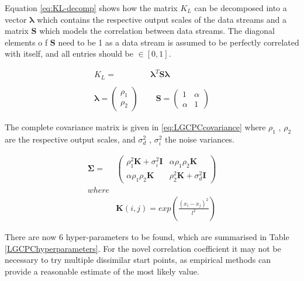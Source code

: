 \documentclass[a4paper,11pt]{report}
\begin{document}
Equation \ref{eq:KL-decomp} shows how the matrix \(K_L\) can be decomposed into a vector \(\boldsymbol{\lambda}\) which contains the respective output scales of the data streams and a matrix \(\mathbf{S}\) which models the correlation between data streams. The diagonal elements o f \(\mathbf{S}\) need to be 1 as a data stream is assumed to be perfectly correlated with itself, and all entries should be \(\in [0,1]\).

\singlespacing
\begin{equation} \label{eq:KL-decomp}
\begin{aligned}
K_L =& \boldsymbol{\lambda}^T \mathbf{S} \boldsymbol{\lambda} \\ \\
\boldsymbol{\lambda} = \left( \begin{array}{cc}
\rho_1  \\
\rho_2 \end{array} \right)\text{ } & \text{ }
\mathbf{S} = \left( \begin{array}{cc}
1 & \alpha  \\
\alpha  & 1 \end{array} \right)
\end{aligned}
\end{equation}
\doublespacing

The complete covariance matrix is given in \ref{eq:LGCPCcovariance} where \(\rho_1\) , \(\rho_2\) are the respective output scales, and \(\sigma_d^2\) , \(\sigma_i^2\) the noise variances.

\begin{equation} \label{eq:LGCPCcovariance}
\begin{aligned}
\boldsymbol{\Sigma} =&  \left( \begin{array}{cc}
\rho_1^2 \mathbf{K} + \sigma_i^2 \mathbf{I} & \alpha \rho_1 \rho_2 \mathbf{K}  \\
\alpha \rho_1 \rho_2 \mathbf{K} & \rho_2^2 \mathbf{K} + \sigma_d^2 \mathbf{I} \end{array} \right) \\ where\\
&\mathbf{K}(i,j) = exp\left( \frac{(x_i-x_j)^2}{l^2}\right)
\end{aligned}
\end{equation}

There are now 6 hyper-parameters to be found, which are summarised in Table \ref{LGCPChyperparameters}. For the novel correlation coefficient it may not be necessary to try multiple dissimilar start points, as empirical methods can provide a reasonable estimate of the most likely value.
\end{document}
